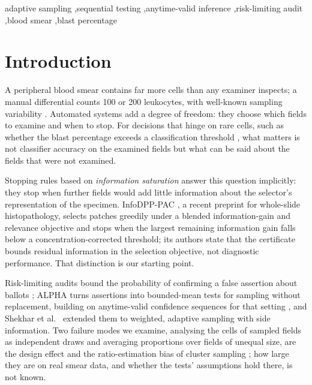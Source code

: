 \documentclass[preprint,12pt]{elsarticle}
\theoremstyle{remark}
\theoremstyle{definition}
\begin{document}
\begin{frontmatter}
\begin{abstract}
\noindent\textbf{Conclusions:} Information saturation does not certify unexamined material. A classifier can reduce verification effort in distribution and increase it under shift; validity depends on the sampling design, the unit of analysis and its weighting, and the reliability of verification.
\end{abstract}

\begin{keyword}
adaptive sampling \sep sequential testing \sep anytime-valid inference \sep risk-limiting audit \sep blood smear \sep blast percentage
\end{keyword}
\end{frontmatter}

\doublespacing
\linenumbers

\section{Introduction}
A peripheral blood smear contains far more cells than any examiner inspects; a manual differential counts 100 or 200 leukocytes, with well-known sampling variability \cite{rumke1978}. Automated systems add a degree of freedom: they choose which fields to examine and when to stop. For decisions that hinge on rare cells, such as whether the blast percentage exceeds a classification threshold \cite{khoury2022who,arber2022icc}, what matters is not classifier accuracy on the examined fields but what can be said about the fields that were not examined.

Stopping rules based on \emph{information saturation} answer this question implicitly: they stop when further fields would add little information about the selector's representation of the specimen. InfoDPP-PAC \cite{mittal2026infodpp}, a recent preprint for whole-slide histopathology, selects patches greedily under a blended information-gain and relevance objective and stops when the largest remaining information gain falls below a concentration-corrected threshold; its authors state that the certificate bounds residual information in the selection objective, not diagnostic performance. That distinction is our starting point.

Risk-limiting audits bound the probability of confirming a false assertion about ballots \cite{lindeman2012gentle}; ALPHA \cite{stark2023alpha} turns assertions into bounded-mean tests for sampling without replacement, building on anytime-valid confidence sequences for that setting \cite{waudbysmith2020wor,waudbysmith2024betting,ville1939}, and Shekhar et al.\ \cite{shekhar2023rlfa} extended them to weighted, adaptive sampling with side information. Two failure modes we examine, analysing the cells of sampled fields as independent draws and averaging proportions over fields of unequal size, are the design effect and the ratio-estimation bias of cluster sampling \cite{kish1965,cochran1977}; how large they are on real smear data, and whether the tests' assumptions hold there, is not known.
\end{document}

